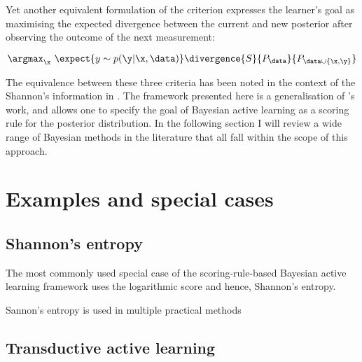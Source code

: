 Yet another equivalent formulation of the criterion expresses the learner's goal as maximising the expected divergence between the current and new posterior after observing the outcome of the next measurement:

\begin{equation}
	\argmax_\x\  \expect{y \sim p(\y\vert \x, \data)}\divergence{S}{P_{\data}}{P_{\data\cup\{\x,\y\}}}
\end{equation}

The equivalence between these three criteria has been noted in the context of the Shannon's information in \citep{MacKay1992}. The framework presented here is a generalisation of \citeauthor{MacKay1992}'s work, and allows one to specify the goal of Bayesian active learning as a scoring rule for the posterior distribution. In the following section I will review a wide range of Bayesian methods in the literature that all fall within the scope of this approach.


\section{Examples and special cases}

\subsection{Shannon's entropy\label{sec:active_learning_shannon_information}}

The most commonly used special case of the scoring-rule-based Bayesian active learning framework uses the logarithmic score and hence, Shannon's entropy. 

Sannon's entropy is used in multiple practical methods \citep{MacKay1992,Lawrence2004,Krause2006,Ji2008,Settles2010,Houlsby2011,Huszar2012quantum}

\subsection{Transductive active learning}

